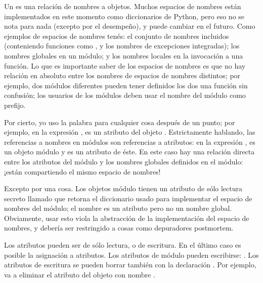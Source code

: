 \documentclass[a4,10pt,spanish]{sphinxmanual}
\begin{document}
\sphinxAtStartPar
Un  es una relación de nombres a objetos.  Muchos espacios de nombres están implementados en este momento como diccionarios de Python, pero eso no se nota para nada (excepto por el desempeño), y puede cambiar en el futuro.  Como ejemplos de espacios de nombres tenés: el conjunto de nombres incluidos (conteniendo funciones como , y los nombres de excepciones integradas); los nombres globales en un módulo; y los nombres locales en la invocación a una función.  Lo que es importante saber de los espacios de nombres es que no hay relación en absoluto entre los nombres de espacios de nombres distintos; por ejemplo, dos módulos diferentes pueden tener definidos los dos una función  sin confusión; los usuarios de los módulos deben usar el nombre del módulo como prefijo.

\sphinxAtStartPar
Por cierto, yo uso la palabra  para cualquier cosa después de un punto; por ejemplo, en la expresión ,  es un atributo del objeto .  Estrictamente hablando, las referencias a nombres en módulos son referencias a atributos: en la expresión ,  es un objeto módulo y  es un atributo de éste.  En este caso hay una relación directa entre los atributos del módulo y los nombres globales definidos en el módulo: ¡están compartiendo el mismo espacio de nombres! %
\begin{footnote}[1]\sphinxAtStartFootnote
Excepto por una cosa. Los objetos módulo tienen un atributo de sólo lectura secreto llamado  que retorna el diccionario usado para implementar el espacio de nombres del módulo; el nombre  es un atributo pero no un nombre global. Obviamente, usar esto viola la abstracción de la implementación del espacio de nombres, y debería ser restringido a cosas como depuradores post\sphinxhyphen{}mortem.
%
\end{footnote}

\sphinxAtStartPar
Los atributos pueden ser de sólo lectura, o de escritura.  En el último caso es posible la asignación a atributos.  Los atributos de módulo pueden escribirse: .  Los atributos de escritura se pueden borrar también con la declaración .  Por ejemplo,  va a eliminar el atributo  del objeto con nombre .
\end{document}
